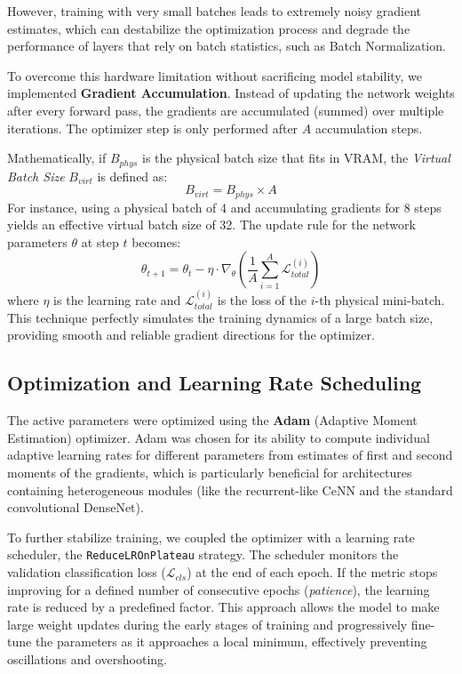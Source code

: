 \documentclass[a4paper,fleqn]{cas-dc}
\begin{document}
However, training with very small batches leads to extremely noisy gradient estimates, which can destabilize the optimization process and degrade the performance of layers that rely on batch statistics, such as Batch Normalization.

To overcome this hardware limitation without sacrificing model stability, we implemented \textbf{Gradient Accumulation}. Instead of updating the network weights after every forward pass, the gradients are accumulated (summed) over multiple iterations. The optimizer step is only performed after $A$ accumulation steps.

Mathematically, if $B_{phys}$ is the physical batch size that fits in VRAM, the \textit{Virtual Batch Size} $B_{virt}$ is defined as:
\begin{equation}
	B_{virt} = B_{phys} \times A
\end{equation}
For instance, using a physical batch of 4 and accumulating gradients for 8 steps yields an effective virtual batch size of 32. The update rule for the network parameters $\theta$ at step $t$ becomes:
\begin{equation}
	\theta_{t+1} = \theta_t - \eta \cdot \nabla_\theta \left( \frac{1}{A} \sum_{i=1}^{A} \mathcal{L}_{total}^{(i)} \right)
\end{equation}
where $\eta$ is the learning rate and $\mathcal{L}_{total}^{(i)}$ is the loss of the $i$-th physical mini-batch. This technique perfectly simulates the training dynamics of a large batch size, providing smooth and reliable gradient directions for the optimizer.

\subsection{Optimization and Learning Rate Scheduling}
The active parameters were optimized using the \textbf{Adam} (Adaptive Moment Estimation) optimizer. Adam was chosen for its ability to compute individual adaptive learning rates for different parameters from estimates of first and second moments of the gradients, which is particularly beneficial for architectures containing heterogeneous modules (like the recurrent-like CeNN and the standard convolutional DenseNet).

To further stabilize training, we coupled the optimizer with a learning rate scheduler,  the \texttt{ReduceLROnPlateau} strategy. The scheduler monitors the validation classification loss ($\mathcal{L}_{cls}$) at the end of each epoch. If the metric stops improving for a defined number of consecutive epochs (\textit{patience}), the learning rate is reduced by a predefined factor. This approach allows the model to make large weight updates during the early stages of training and progressively fine-tune the parameters as it approaches a local minimum, effectively preventing oscillations and overshooting.
\end{document}
